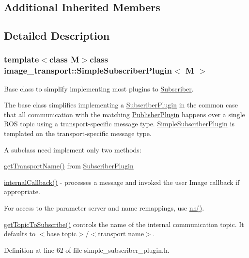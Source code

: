\subsection*{Additional Inherited Members}


\subsection{Detailed Description}
\subsubsection*{template$<$class M$>$class image\-\_\-transport\-::\-Simple\-Subscriber\-Plugin$<$ M $>$}

Base class to simplify implementing most plugins to \hyperlink{classimage__transport_1_1_subscriber}{Subscriber}. 

The base class simplifies implementing a \hyperlink{classimage__transport_1_1_subscriber_plugin}{Subscriber\-Plugin} in the common case that all communication with the matching \hyperlink{classimage__transport_1_1_publisher_plugin}{Publisher\-Plugin} happens over a single R\-O\-S topic using a transport-\/specific message type. \hyperlink{classimage__transport_1_1_simple_subscriber_plugin}{Simple\-Subscriber\-Plugin} is templated on the transport-\/specific message type.

A subclass need implement only two methods\-:
\begin{DoxyItemize}
\item \hyperlink{classimage__transport_1_1_subscriber_plugin_a647dc0f6e0c34f0b4d8b809b3c679f88}{get\-Transport\-Name()} from \hyperlink{classimage__transport_1_1_subscriber_plugin}{Subscriber\-Plugin}
\item \hyperlink{classimage__transport_1_1_simple_subscriber_plugin_ae3fbeb43694289e50670d7050da82a1a}{internal\-Callback()} -\/ processes a message and invoked the user Image callback if appropriate.
\end{DoxyItemize}

For access to the parameter server and name remappings, use \hyperlink{classimage__transport_1_1_simple_subscriber_plugin_a700540fba60461092751c14d4ff27681}{nh()}.

\hyperlink{classimage__transport_1_1_simple_subscriber_plugin_a02016ab17568754d5319ae6fd949e268}{get\-Topic\-To\-Subscribe()} controls the name of the internal communication topic. It defaults to $<$base topic$>$/$<$transport name$>$. 

Definition at line 62 of file simple\-\_\-subscriber\-\_\-plugin.\-h.



